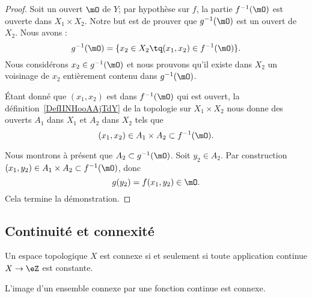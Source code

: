 \begin{proof}
	Soit un ouvert \( \mO\) de \( Y\); par hypothèse sur \( f\), la partie \( f^{-1}(\mO)\) est ouverte dans \( X_1\times X_2\). Notre but est de prouver que \( g^{-1}(\mO)\) est un ouvert de \( X_2\). Nous avons :
	\begin{equation}
		g^{-1}(\mO)=\{ x_2\in X_2\tq (x_1,x_2)\in f^{-1}(\mO) \}.
	\end{equation}
	Nous considérons \( x_2\in g^{-1}(\mO)\) et nous prouvons qu'il existe dans \( X_2\) un voisinage de \( x_2\) entièrement contenu dans \( g^{-1}(\mO)\).

	Étant donné que \( (x_1,x_2)\) est dans \( f^{-1}(\mO)\) qui est ouvert, la définition~\ref{DefIINHooAAjTdY} de la topologie sur \( X_1\times X_2\) nous donne des ouverts \( A_1\) dans \( X_1\) et \( A_2\) dans \( X_2\) tels que
	\begin{equation}
		(x_1,x_2)\in A_1\times A_2\subset f^{-1}(\mO).
	\end{equation}

	Nous montrons à présent que \( A_2\subset g^{-1}(\mO)\). Soit \( y_2\in A_2\). Par construction \( (x_1,y_2)\in A_1\times A_2\subset f^{-1}(\mO)\), donc
	\begin{equation}
		g(y_2)=f(x_1,y_2)\in \mO.
	\end{equation}
	Cela termine la démonstration.
\end{proof}

\subsection{Continuité et connexité}

\begin{proposition} \label{PropConnexiteViaFonction}
	Un espace topologique \( X \) est connexe si et seulement si toute application continue \( X\to \eZ\) est constante.
\end{proposition}

\begin{proposition}\label{PropGWMVzqb}
	L'image d'un ensemble connexe par une fonction continue est connexe.
\end{proposition}

